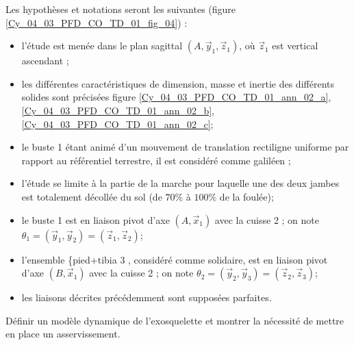 Les hypothèses et notations seront les suivantes (figure \ref{Cy_04_03_PFD_CO_TD_01_fig_04}) :
\begin{itemize}
  \item l'étude est menée dans le plan sagittal $\left(A, \vec{y}_{1}, \vec{z}_{1}\right)$, où $\vec{z}_{1}$ est vertical ascendant ;
  \item les différentes caractéristiques de dimension, masse et inertie des différents solides sont précisées figure  \ref{Cy_04_03_PFD_CO_TD_01_ann_02_a},\ref{Cy_04_03_PFD_CO_TD_01_ann_02_b},\ref{Cy_04_03_PFD_CO_TD_01_ann_02_c};
  \item le buste 1 étant animé d'un mouvement de translation rectiligne uniforme par rapport au référentiel terrestre, il est considéré comme galiléen ;
  \item l'étude se limite à la partie de la marche pour laquelle une des deux jambes est totalement décollée du sol (de $70 \%$ à $100 \%$ de la foulée);%
  \item le buste 1 est en liaison pivot d'axe $\left(A, \vec{x}_{1}\right)$ avec la cuisse 2 ; on note $\theta_{1}=\left(\vec{y}_{1}, \vec{y}_{2}\right)=\left(\vec{z}_{1}, \vec{z}_{2}\right)$;
  \item l'ensemble \{pied+tibia 3 , considéré comme solidaire, est en liaison pivot d'axe $\left(B, \vec{x}_{1}\right)$ avec la cuisse 2 ; on note $\theta_{2}=\left(\vec{y}_{2}, \vec{y}_{3}\right)=\left(\vec{z}_{2}, \vec{z}_{3}\right)$;
  \item les liaisons décrites précédemment sont supposées parfaites.
\end{itemize}


%


\begin{obj}
Définir un modèle dynamique de l’exosquelette et montrer la nécessité de mettre en place un asservissement.
\end{obj}


